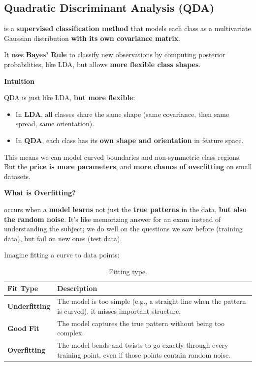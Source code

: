 \subsection{Quadratic Discriminant Analysis (QDA)}

 is a \textbf{supervised classification method} that models each class as a multivariate Gaussian distribution \textbf{with its own covariance matrix}.

\highspace
It uses \textbf{Bayes' Rule} to classify new observations by computing posterior probabilities, like LDA, but allows \textbf{more flexible class shapes}.

\highspace
\begin{flushleft}
    \textcolor{Green3}{ \textbf{Intuition}}
\end{flushleft}
QDA is just like LDA, \textbf{but more flexible}:
\begin{itemize}
    \item In \textbf{LDA}, all classes share the same shape (same covariance, then same spread, same orientation).
    \item In \textbf{QDA}, each class has its \textbf{own shape and orientation} in feature space.
\end{itemize}
This means we can model curved boundaries and non-symmetric class regions. But the \textbf{price is more parameters}, and \textbf{more chance of overfitting} on small datasets.

\highspace
\begin{flushleft}
    \textcolor{Red2}{ \textbf{What is Overfitting?}}
    \label{def: Overfitting}
\end{flushleft}
 occurs when a \textbf{model learns} not just the \textbf{true patterns} in the data, \textbf{but also the random noise}. It's like memorizing answer for an exam instead of understanding the subject; we do well on the questions we saw before (training data), but fail on new ones (test data).

\highspace
Imagine fitting a curve to data points:
\begin{table}[!htp]
    \centering
    \begin{tabular}{@{} l | p{20em} @{}}
        \toprule
        Fit Type & Description \\
        \midrule
        \textbf{Underfitting}   & The model is too simple (e.g., a straight line when the pattern is curved), it misses important structure. \\ [.5em]
        \textbf{Good Fit}       & The model captures the true pattern without being too complex. \\ [.5em]
        \textbf{Overfitting}    & The model bends and twists to go exactly through every training point, even if those points contain random noise. \\
        \bottomrule
    \end{tabular}
    \caption{Fitting type.}
\end{table}

